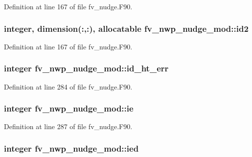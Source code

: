 Definition at line 167 of file fv\-\_\-nudge.\-F90.

\subsubsection[{id2}]{\setlength{\rightskip}{0pt plus 5cm}integer, dimension(\-:,\-:), allocatable fv\-\_\-nwp\-\_\-nudge\-\_\-mod\-::id2\hspace{0.3cm}{\ttfamily [private]}}\label{classfv__nwp__nudge__mod_a10d50bc3c563bcc270ef37108729f381}


Definition at line 167 of file fv\-\_\-nudge.\-F90.

\subsubsection[{id\-\_\-ht\-\_\-err}]{\setlength{\rightskip}{0pt plus 5cm}integer fv\-\_\-nwp\-\_\-nudge\-\_\-mod\-::id\-\_\-ht\-\_\-err\hspace{0.3cm}{\ttfamily [private]}}\label{classfv__nwp__nudge__mod_aff11af198e7507203fac0b6fc479060d}


Definition at line 284 of file fv\-\_\-nudge.\-F90.

\subsubsection[{ie}]{\setlength{\rightskip}{0pt plus 5cm}integer fv\-\_\-nwp\-\_\-nudge\-\_\-mod\-::ie\hspace{0.3cm}{\ttfamily [private]}}\label{classfv__nwp__nudge__mod_a11b27e9ca5d61dc084748127098af2fb}


Definition at line 287 of file fv\-\_\-nudge.\-F90.

\subsubsection[{ied}]{\setlength{\rightskip}{0pt plus 5cm}integer fv\-\_\-nwp\-\_\-nudge\-\_\-mod\-::ied\hspace{0.3cm}{\ttfamily [private]}}\label{classfv__nwp__nudge__mod_a49d07573330869c0885c65c2ef35d8f4}


